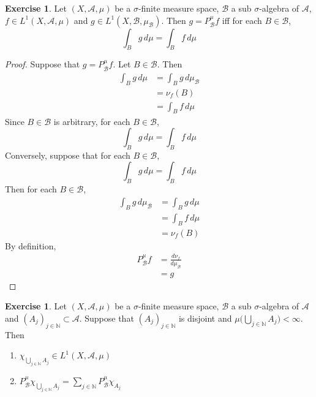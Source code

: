 \documentclass{book}
\theoremstyle{definition}
\newtheorem{ex}[definition]{Exercise}
\newcommand{\sig}{\sigma}
\newcommand{\N}{\mathbb{N}}
\newcommand{\MA}{\mathcal{A}}
\newcommand{\MB}{\mathcal{B}}
\DeclareMathOperator*{\0}{\mbf{0}}
\DeclareMathOperator*{\1}{\mbf{1}}
\newcommand{\dmu}{\, d \mu}
\begin{document}
	\begin{ex}
		Let $(X, \MA, \mu)$ be a $\sig$-finite measure space, $\MB$ a sub $\sig$-algebra of $\MA$, $f \in L^1(X, \MA, \mu)$ and $g \in L^1(X, \MB, \mu_{\MB})$. Then $g = P^{\mu}_{\MB}f$ iff for each $B \in \MB$, 
		$$\int_B g \dmu = \int_B f \dmu$$
	\end{ex}

	\begin{proof}
		Suppose that $g = P^{\mu}_{\MB}f$. Let $B \in \MB$. Then 
		\begin{align*}
			\int_B g \dmu 
			& = \int_B g \dmu_{\MB} \\
			& = \nu_f(B) \\
			& = \int_B f \dmu 
		\end{align*}
		Since $B \in \MB$ is arbitrary, for each $B \in \MB$, 
		$$\int_B g \dmu = \int_B f \dmu$$ 
		Conversely, suppose that for each $B \in \MB$, 
		$$\int_B g \dmu = \int_B f \dmu$$ 
		Then for each $B \in \MB$,
		\begin{align*}
			\int_B g \dmu_{\MB} 
			& = \int_B g \dmu \\
			& = \int_B f \dmu \\
			& = \nu_f(B) 
		\end{align*} 
		By definition, 
		\begin{align*}
			P^{\mu}_{\MB}f 
			& =  \frac{d \nu_f}{d \mu_{\MB}} \\
			& = g
		\end{align*} 
	\end{proof}
	
	\begin{ex}
		Let $(X, \MA, \mu)$ be a $\sig$-finite measure space, $\MB$ a sub $\sig$-algebra of $\MA$ and $(A_{j})_{j \in \N} \subset \MA$. Suppose that $(A_j)_{j \in \N}$ is disjoint and $\mu \bigg(\bigcup\limits_{j \in \N} A_j \bigg) < \infty$. Then 
		\begin{enumerate}
			\item $\chi_{\bigcup\limits_{j \in \N} A_j} \in L^1(X, \MA, \mu)$
			\item $P^{\mu}_{\MB} \chi_{\bigcup\limits_{j \in \N} A_j} = \sum\limits_{j \in \N} P^{\mu}_{\MB}\chi_{A_j}$
		\end{enumerate}
	\end{ex}
	
\end{document}
